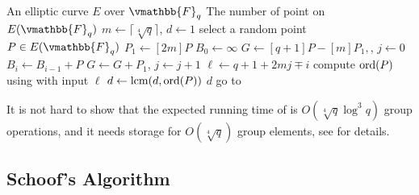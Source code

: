 \begin{algorithm}
\label{algorithm:count-baby-giant}
\begin{algorithmic}[1]
\REQUIRE An elliptic curve $E$ over $\vmathbb{F}_q$
\ENSURE  The number of point on $E(\vmathbb{F}_q)$
\STATE $m \leftarrow \lceil \sqrt[4]{q} \rceil$, $d \leftarrow 1$
\STATE select a random point $P \in E(\vmathbb{F}_q)$
\label{step:b-g-rand}
\STATE $P_1 \leftarrow [2m]P$
\STATE $B_0 \leftarrow \infty$
\STATE $G \leftarrow [q + 1]P - [m]P_1,$, $j \leftarrow 0$
	\STATE $B_i \leftarrow B_{i - 1} + P$
\ENDFOR
{}
	\STATE $G \leftarrow G + P_1$, $j \leftarrow j + 1$
\ENDWHILE
\STATE $\ell \leftarrow q + 1 + 2mj \mp i$
\STATE compute $\operatorname{ord}(P)$ using  with input $\ell$
\STATE $d \leftarrow \operatorname{lcm}(d, \operatorname{ord}(P))$
	\RETURN $d$
\ENDIF
\STATE go to 
\end{algorithmic}
\end{algorithm}

It is not hard to show that the expected running time of  
is $O(\sqrt[4]{q}\log^3 q)$ group operations, and it needs storage for $O(\sqrt[4]{q})$ group 
elements, see \cite{Enge1999} for details.





\subsection{Schoof's Algorithm}

